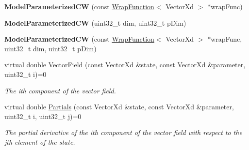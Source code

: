 \begin{DoxyCompactItemize}
\item 
\hypertarget{struct_d_r_d_s_p_1_1_model_parameterized_c_w_a6dc3f89073452ab9fe6e0060aa14ad24}{{\bfseries Model\-Parameterized\-C\-W} (const \hyperlink{struct_d_r_d_s_p_1_1_wrap_function}{Wrap\-Function}$<$ Vector\-Xd $>$ $\ast$wrap\-Func)}\label{struct_d_r_d_s_p_1_1_model_parameterized_c_w_a6dc3f89073452ab9fe6e0060aa14ad24}

\item 
\hypertarget{struct_d_r_d_s_p_1_1_model_parameterized_c_w_a81d7ee9a3974ed8bee6664609ee96b69}{{\bfseries Model\-Parameterized\-C\-W} (uint32\-\_\-t dim, uint32\-\_\-t p\-Dim)}\label{struct_d_r_d_s_p_1_1_model_parameterized_c_w_a81d7ee9a3974ed8bee6664609ee96b69}

\item 
\hypertarget{struct_d_r_d_s_p_1_1_model_parameterized_c_w_a9ce0b83304e3da9c41142baf2e5f8b75}{{\bfseries Model\-Parameterized\-C\-W} (const \hyperlink{struct_d_r_d_s_p_1_1_wrap_function}{Wrap\-Function}$<$ Vector\-Xd $>$ $\ast$wrap\-Func, uint32\-\_\-t dim, uint32\-\_\-t p\-Dim)}\label{struct_d_r_d_s_p_1_1_model_parameterized_c_w_a9ce0b83304e3da9c41142baf2e5f8b75}

\item 
\hypertarget{struct_d_r_d_s_p_1_1_model_parameterized_c_w_a21a471d9a6eebf3939b6605a9243253d}{virtual double \hyperlink{struct_d_r_d_s_p_1_1_model_parameterized_c_w_a21a471d9a6eebf3939b6605a9243253d}{Vector\-Field} (const Vector\-Xd \&state, const Vector\-Xd \&parameter, uint32\-\_\-t i)=0}\label{struct_d_r_d_s_p_1_1_model_parameterized_c_w_a21a471d9a6eebf3939b6605a9243253d}

\begin{DoxyCompactList}\small\item\em The ith component of the vector field. \end{DoxyCompactList}\item 
\hypertarget{struct_d_r_d_s_p_1_1_model_parameterized_c_w_a6b8e4d5f583b7553db1986a6ef859c86}{virtual double \hyperlink{struct_d_r_d_s_p_1_1_model_parameterized_c_w_a6b8e4d5f583b7553db1986a6ef859c86}{Partials} (const Vector\-Xd \&state, const Vector\-Xd \&parameter, uint32\-\_\-t i, uint32\-\_\-t j)=0}\label{struct_d_r_d_s_p_1_1_model_parameterized_c_w_a6b8e4d5f583b7553db1986a6ef859c86}

\begin{DoxyCompactList}\small\item\em The partial derivative of the ith component of the vector field with respect to the jth element of the state. \end{DoxyCompactList}\end{DoxyCompactItemize}
